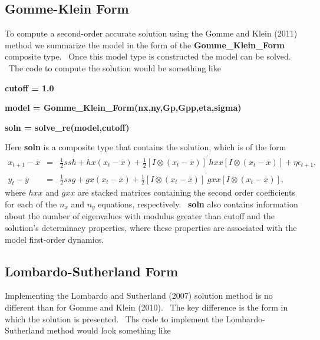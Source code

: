 \documentclass[thmsa,notitlepage,11pt]{article}
\begin{document}
\subsection{Gomme-Klein Form}

To compute a second-order accurate solution using the Gomme and Klein (2011)
method we summarize the model in the form of the \textbf{Gomme\_Klein\_Form}
composite type. \ Once this model type is constructed the model can be
solved. \ The code to compute the solution would be something like

\bigskip

\textbf{cutoff = 1.0}

\textbf{model = Gomme\_Klein\_Form(nx,ny,Gp,Gpp,eta,sigma)}

\textbf{soln = solve\_re(model,cutoff)}

\bigskip

Here \textbf{soln} is a composite type that contains the solution, which is
of the form%
\begin{eqnarray*}
x_{t+1}-\overline{x} &=&\frac{1}{2}ssh+hx\left( x_{t}-\overline{x}\right) +%
\frac{1}{2}\left[ I\otimes \left( x_{t}-\overline{x}\right) \right]
^{^{\prime }}hxx\left[ I\otimes \left( x_{t}-\overline{x}\right) \right]
+\eta \epsilon _{t+1}, \\
y_{t}-\overline{y} &=&\frac{1}{2}ssg+gx\left( x_{t}-\overline{x}\right) +%
\frac{1}{2}\left[ I\otimes \left( x_{t}-\overline{x}\right) \right]
^{^{\prime }}gxx\left[ I\otimes \left( x_{t}-\overline{x}\right) \right] ,
\end{eqnarray*}%
where $hxx$ and $gxx$ are stacked matrices containing the second order
coefficients for each of the $n_{x}$ and $n_{y}$ equations, respectively. \ 
\textbf{soln} also contains information about the number of eigenvalues with
modulus greater than cutoff and the solution's determinacy properties, where
these properties are associated with the model first-order dynamics.

\subsection{Lombardo-Sutherland Form}

Implementing the Lombardo and Sutherland (2007) solution method is no
different than for Gomme and Klein (2010). \ The key difference is the form
in which the solution is presented. \ Ths code to implement the
Lombardo-Sutherland method would look something like

\bigskip
\end{document}
